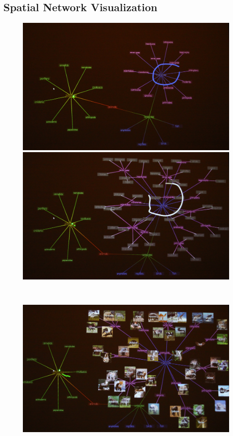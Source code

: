 \documentclass[review]{vgtc}                 %
\begin{document}
\subsection{Spatial Network Visualization}

\begin{figure}[t]
  \begin{center}
  \begin{minipage}{0.99\linewidth}
    \includegraphics[width=0.49\linewidth]{images/graph1.jpg}
    \includegraphics[width=0.49\linewidth]{images/graph2.jpg}
  \end{minipage}  \\
  \begin{minipage}{0.99\linewidth}
    \includegraphics[width=0.99\linewidth]{images/graph3.jpg}     
  \end{minipage}  \\
  \begin{minipage}{0.99\linewidth}

\end{minipage}
\end{center}
\end{figure}
\end{document}
